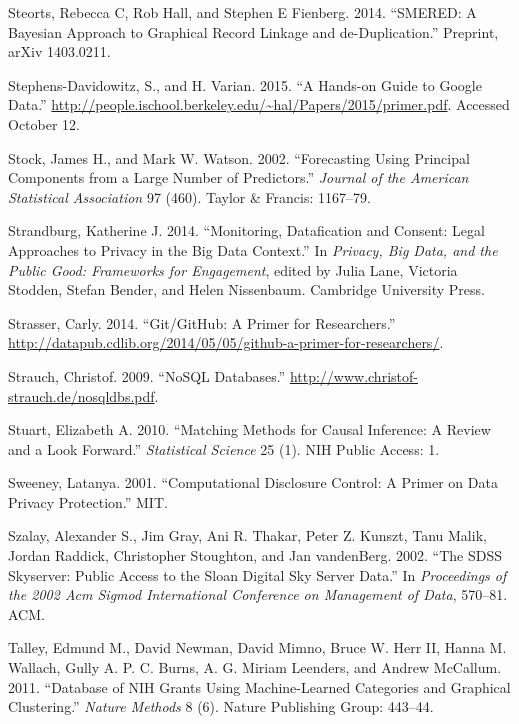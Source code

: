 \documentclass[]{krantz}
\begin{document}
\hypertarget{ref-steorts2014smered}{}
Steorts, Rebecca C, Rob Hall, and Stephen E Fienberg. 2014. ``SMERED: A
Bayesian Approach to Graphical Record Linkage and de-Duplication.''
Preprint, arXiv 1403.0211.

\hypertarget{ref-SDV2015}{}
Stephens-Davidowitz, S., and H. Varian. 2015. ``A Hands-on Guide to
Google Data.''
\url{http://people.ischool.berkeley.edu/~hal/Papers/2015/primer.pdf}.
Accessed October 12.

\hypertarget{ref-stock2002forecasting}{}
Stock, James H., and Mark W. Watson. 2002. ``Forecasting Using Principal
Components from a Large Number of Predictors.'' \emph{Journal of the
American Statistical Association} 97 (460). Taylor \& Francis: 1167--79.

\hypertarget{ref-Strandburg2014}{}
Strandburg, Katherine J. 2014. ``Monitoring, Datafication and Consent:
Legal Approaches to Privacy in the Big Data Context.'' In \emph{Privacy,
Big Data, and the Public Good: Frameworks for Engagement}, edited by
Julia Lane, Victoria Stodden, Stefan Bender, and Helen Nissenbaum.
Cambridge University Press.

\hypertarget{ref-GitResearch}{}
Strasser, Carly. 2014. ``Git/GitHub: A Primer for Researchers.''
\url{http://datapub.cdlib.org/2014/05/05/github-a-primer-for-researchers/}.

\hypertarget{ref-NoSQLdatabases}{}
Strauch, Christof. 2009. ``NoSQL Databases.''
\url{http://www.christof-strauch.de/nosqldbs.pdf}.

\hypertarget{ref-stuart2010matching}{}
Stuart, Elizabeth A. 2010. ``Matching Methods for Causal Inference: A
Review and a Look Forward.'' \emph{Statistical Science} 25 (1). NIH
Public Access: 1.

\hypertarget{ref-sweeney2001computational}{}
Sweeney, Latanya. 2001. ``Computational Disclosure Control: A Primer on
Data Privacy Protection.'' MIT.

\hypertarget{ref-szalay2002sdss}{}
Szalay, Alexander S., Jim Gray, Ani R. Thakar, Peter Z. Kunszt, Tanu
Malik, Jordan Raddick, Christopher Stoughton, and Jan vandenBerg. 2002.
``The SDSS Skyserver: Public Access to the Sloan Digital Sky Server
Data.'' In \emph{Proceedings of the 2002 Acm Sigmod International
Conference on Management of Data}, 570--81. ACM.

\hypertarget{ref-talley2011database}{}
Talley, Edmund M., David Newman, David Mimno, Bruce W. Herr II, Hanna M.
Wallach, Gully A. P. C. Burns, A. G. Miriam Leenders, and Andrew
McCallum. 2011. ``Database of NIH Grants Using Machine-Learned
Categories and Graphical Clustering.'' \emph{Nature Methods} 8 (6).
Nature Publishing Group: 443--44.
\end{document}

